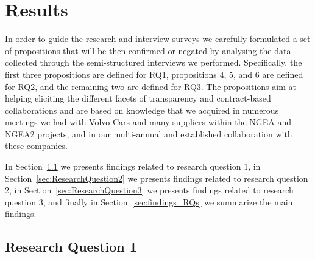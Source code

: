 \section{Results}\label{sec:results}

In order to guide the
research and interview surveys %
we carefully formulated a set of propositions that will be then confirmed or negated by analysing the data collected through the semi-structured interviews we performed. Specifically, the first three propositions are defined for RQ1, propositions 4, 5, and 6 are defined for RQ2,  and the remaining two are defined for RQ3.
The propositions aim at helping eliciting the different facets of transparency and contract-based collaborations and are based on knowledge that we acquired in numerous meetings we had with Volvo Cars and many suppliers within the NGEA and NGEA2 projects, and in our multi-annual and established collaboration with these companies. %



In Section~\ref{sec:ResearchQuestion1} we presents findings related to research question 1, in Section~\ref{sec:ResearchQuestion2} we presents findings related to research question 2,  in Section~\ref{sec:ResearchQuestion3} we presents findings related to research question 3, and finally
 in Section~\ref{sec:findings_RQs} we summarize the main findings.

\subsection{Research Question 1}\label{sec:ResearchQuestion1}

